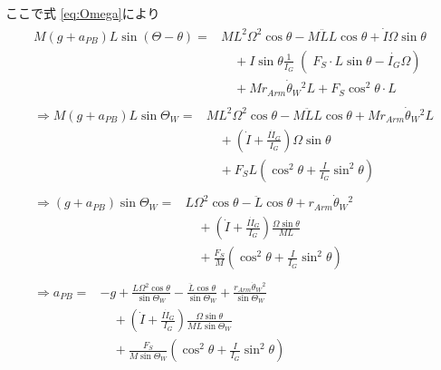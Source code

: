 \documentclass[a4paper,11pt]{jsarticle}
\begin{document}
ここで式 \ref{eq:Omega}により
\begin{align}
  \begin{aligned}
    M(g+a_{PB}) L\sin(\Theta - \theta)
    =&
    ML^2\Omega^2 \cos\theta - M\ddot{L}L \cos\theta
    + \dot{I}\Omega \sin\theta 
    \\
    &\quad + I\sin\theta
    \left.\frac{1}{I_G}\middle(
      F_S \cdot L\sin\theta
      -\dot{I_G}\Omega
    \right)
    \\
    &\quad + Mr_{Arm}\dot{\theta}_W{}^2L + F_S\cos^2\theta \cdot L
  \end{aligned}
  \\
  \begin{aligned}
    \Rightarrow
    M(g+a_{PB}) L\sin\Theta_W
    =&
    ML^2\Omega^2 \cos\theta - M\ddot{L}L \cos\theta
    + Mr_{Arm}\dot{\theta}_W{}^2L 
    \\
    &\quad
    + \left(
      \dot{I} + \frac{I\dot{I}_G}{I_G}
    \right)
    \Omega\sin\theta
    \\
    &\quad
    + F_S L\left(
      \cos^2\theta + \frac{I}{I_G}\sin^2\theta
    \right)
  \end{aligned}
  \\
  \begin{aligned}
    \Rightarrow
    (g+a_{PB})\sin\Theta_W
    =&
    L\Omega^2 \cos\theta - \ddot{L}\cos\theta
    + r_{Arm}\dot{\theta}_W{}^2
    \\
    &\quad
    + \left(
      \dot{I} + \frac{I\dot{I}_G}{I_G}
    \right)
    \frac{\Omega\sin\theta}{ML}
    \\
    &\quad
    + \frac{F_S}{M} \left(
      \cos^2\theta + \frac{I}{I_G}\sin^2\theta
    \right)
  \end{aligned}
  \\
  \begin{aligned}
    \Rightarrow
    a_{PB}
    =&
    -g +
    \frac{L\Omega^2 \cos\theta}{\sin\Theta_W}
    - \frac{\ddot{L}\cos\theta}{\sin\Theta_W}
    + \frac{r_{Arm}\dot{\theta}_W{}^2}{\sin\Theta_W}
    \\
    &\quad
    + \left(
      \dot{I} + \frac{I\dot{I}_G}{I_G}
    \right)
    \frac{\Omega\sin\theta}{ML\sin\Theta_W}
    \\
    &\quad
    + \frac{F_S}{M\sin\Theta_W} \left(
      \cos^2\theta + \frac{I}{I_G}\sin^2\theta
    \right)
  \end{aligned}
\end{align}
\end{document}
